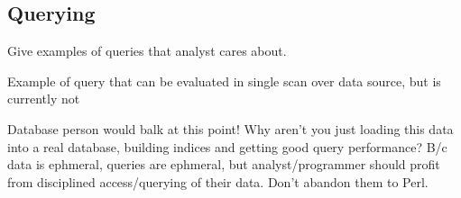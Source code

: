 \subsection{Querying}

Give examples of queries that analyst cares about. 

Example of query that can be evaluated in single scan over data
source, but is currently not 

Database person would balk at this point!  Why aren't you just loading
this data into a real database, building indices and getting good
query performance?  B/c data is ephmeral, queries are ephmeral, but
analyst/programmer should profit from disciplined access/querying of
their data.  Don't abandon them to Perl. 

